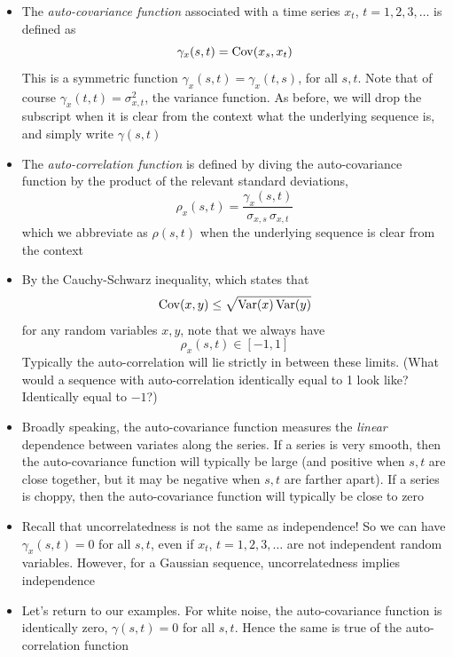 \documentclass{article}
\begin{document}
\begin{itemize}
\item The \emph{auto-covariance function} associated with a time series $x_t$,
  $t=1,2,3,\dots$ is defined as
  \[
  \gamma_x(s,t) = \operatorname{Cov}(x_s, x_t)
  \]
  This is a symmetric function $\gamma_x(s,t) = \gamma_x(t,s)$, for all $s,t$.
  Note that of course $\gamma_x(t,t) = \sigma^2_{x,t}$, the variance
  function. As before, we will drop the subscript when it is clear from the
  context what the underlying sequence is, and simply write $\gamma(s,t)$  

\item The \emph{auto-correlation function} is defined by diving the
  auto-covariance function by the product of the relevant standard deviations, 
  \[
  \rho_x(s,t) = \frac{\gamma_x(s,t)}{\sigma_{x,s} \, \sigma_{x,t}}
  \]
  which we abbreviate as $\rho(s,t)$ when the underlying sequence is clear from
  the context 

\item By the Cauchy-Schwarz inequality, which states that
  \[
  \operatorname{Cov}(x, y) \leq \sqrt{\operatorname{Var}(x) \operatorname{Var}(y)}
  \]
  for any random variables $x,y$, note that we always have
  \[
  \rho_x(s,t) \in [-1, 1]
  \]
  Typically the auto-correlation will lie strictly in between these limits. 
  (What would a sequence with auto-correlation identically equal to 1 look like?  
  Identically equal to $-1$?) 

\item Broadly speaking, the auto-covariance function measures the \emph{linear}
  dependence between variates along the series. If a series is very smooth, then
  the auto-covariance function will typically be large (and positive when $s,t$
  are close together, but it may be negative when $s,t$ are farther apart). If a 
  series is choppy, then the auto-covariance function will typically be close to
  zero 

\item Recall that uncorrelatedness is not the same as independence! So we can
  have $\gamma_x(s,t) = 0$ for all $s,t$, even if $x_t$, $t=1,2,3,\dots$ are not
  independent random variables. However, for a Gaussian sequence,
  uncorrelatedness implies independence

\item Let's return to our examples. For white noise, the auto-covariance
  function is identically zero, $\gamma(s,t) = 0$ for all $s,t$. Hence the same
  is true of the auto-correlation function


\end{itemize}
\end{document}
